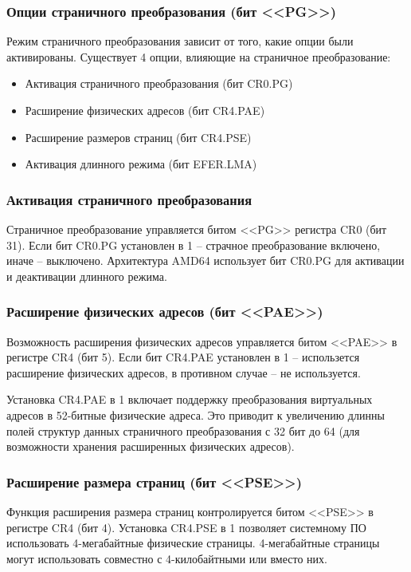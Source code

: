 \subsubsection*{Опции страничного преобразования (бит <<PG>>)}
Режим страничного преобразования зависит от того, какие опции были активированы. Существует
4 опции, влияющие на страничное преобразование:
\begin{itemize}
	\item Активация страничного преобразования (бит CR0.PG)
	\item Расширение физических адресов (бит CR4.PAE)
	\item Расширение размеров страниц (бит CR4.PSE)
	\item Активация длинного режима (бит EFER.LMA)
\end{itemize}

\subsubsection*{Активация страничного преобразования}
Страничное преобразование управляется битом <<PG>> регистра CR0 (бит 31). Если бит CR0.PG установлен в 1 --
страчное преобразование включено, иначе -- выключено. Архитектура AMD64 использует бит CR0.PG для активации
и деактивации длинного режима.

\subsubsection*{Расширение физических адресов (бит <<PAE>>)}
Возможность расширения физических адресов управляется битом <<PAE>> в регистре CR4 (бит 5). Если бит CR4.PAE
установлен в 1 -- использется расширение физических адресов, в противном случае -- не используется.

Установка CR4.PAE в 1 включает поддержку преобразования виртуальных адресов в 52-битные физические адреса.
Это приводит к увеличению длинны полей структур данных страничного преобразования с 32 бит до 64 (для
возможности хранения расширенных физических адресов).

\subsubsection*{Расширение размера страниц (бит <<PSE>>)}
Функция расширения размера страниц контролируется битом <<PSE>> в регистре CR4 (бит 4). Установка CR4.PSE в 1
позволяет системному ПО использовать 4-мегабайтные физические страницы. 4-мегабайтные страницы могут
использовать совместно с 4-килобайтными или вместо них.

